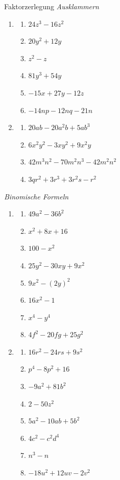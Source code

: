 \clearpage
\begin{ueb}
    {Faktorzerlegung}{}
    \emph{Ausklammern}
    \begin{enumerate}
        \item
              \begin{enumerate}
                  \item \(24z^3-16z^2\)
                  \item \(20y^2+12y\)
                  \item \(z^2-z\)
                  \item \(81y^3+54y\)
                  \item \(-15x+27y-12z\)
                  \item \(-14np-12nq-21n\)
              \end{enumerate}

        \item
              \begin{enumerate}
                  \item \(20ab-20a^2b+5ab^3\)
                  \item \(6x^2y^2-3xy^2+9x^2y\)
                  \item \(42m^3n^2-70m^2n^3-42m^2n^2\)
                  \item \(3qr^2+3r^3+3r^2s-r^2\)
              \end{enumerate}
    \end{enumerate}
    \emph{Binomische Formeln}
    \begin{enumerate}[resume]
        \item
              \begin{enumerate}
                  \item \(49a^2-36b^2\)
                  \item \(x^2+8x+16\)
                  \item \(100-x^2\)
                  \item \(25y^2-30xy+9x^2\)
                  \item \(9x^2-(2y)^2\)
                  \item \(16x^2-1\)
                  \item \(x^4-y^4\)
                  \item \(4f^2-20fg+25g^2\)
              \end{enumerate}

        \item
              \begin{enumerate}
                  \item \(16r^2-24rs+9s^2\)
                  \item \(p^4-8p^2+16\)
                  \item \(-9a^2+81b^2\)
                  \item \(2-50z^2\)
                  \item \(5a^2-10ab+5b^2\)
                  \item \(4c^2-c^2d^4\)
                  \item \(n^3-n\)
                  \item \(-18u^2+12uv-2v^2\)
              \end{enumerate}


\end{enumerate}
\end{ueb}
